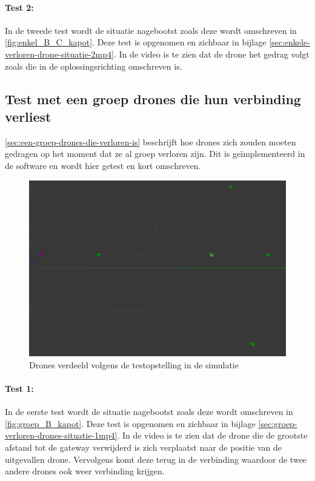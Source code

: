 \documentclass[a4paper, 11pt, oneside]{report}
\begin{document}
\paragraph{Test 2:} In de tweede test wordt de situatie nagebootst zoals deze wordt omschreven in \autoref{fig:enkel_B_C_kapot}.
Deze test is opgenomen en zichbaar in bijlage \ref{sec:enkele-verloren-drone-situatie-2mp4}.
In de video is te zien dat de drone het gedrag volgt zoals die in de oplossingsrichting omschreven is. 


\subsection{Test met een groep drones die hun verbinding verliest}
\autoref{sec:een-groep-drones-die-verloren-is} beschrijft hoe drones zich zouden moeten gedragen op het moment dat ze al groep verloren zijn.
Dit is geïmplementeerd in de software en wordt hier getest en kort omschreven.

\begin{figure}[H]
	\begin{center}\includegraphics[width=.7\linewidth]{Afbeeldingen/testopstelling2_in_simulatie.png}\end{center}
	\caption{Drones verdeeld volgens de testopstelling in de simulatie}
	\label{fig:applicatie-testopstelling-2-drones-in-sim}
\end{figure}


\paragraph{Test 1:} In de eerste test wordt de situatie nagebootst zoals deze wordt omschreven in \autoref{fig:groep_B_kapot}.
Deze test is opgenomen en zichbaar in bijlage \ref{sec:groep-verloren-drones-situatie-1mp4}. 
In de video is te zien dat de drone die de grootste afstand tot de gateway verwijderd is zich verplaatst naar de positie van de uitgevallen drone. Vervolgens komt deze terug in de verbinding waardoor de twee andere drones ook weer verbinding krijgen.  
\end{document}
